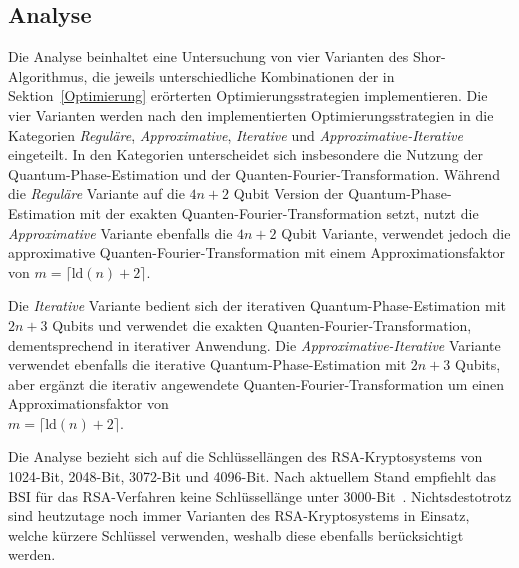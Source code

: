 \subsection*{Analyse}
Die Analyse beinhaltet eine Untersuchung von vier Varianten des Shor-Algorithmus, 
die jeweils unterschiedliche Kombinationen der in Sektion~\ref{Optimierung} erörterten Optimierungsstrategien implementieren.
Die vier Varianten werden nach den implementierten Optimierungsstrategien in die Kategorien \textit{Reguläre}, 
\textit{Approximative}, \textit{Iterative} und \textit{Approximative-Iterative} eingeteilt.
In den Kategorien unterscheidet sich insbesondere die Nutzung der Quantum-Phase-Estimation und der Quanten-Fourier-Transformation. 
Während die \textit{Reguläre} Variante auf die \(4n+2\) Qubit Version der Quantum-Phase-Estimation mit der exakten Quanten-Fourier-Transformation setzt, 
nutzt die \textit{Approximative} Variante ebenfalls die \(4n+2\) Qubit Variante, 
verwendet jedoch die approximative Quanten-Fourier-Transformation mit einem Approximationsfaktor von \(m = \lceil\text{ld}(n)+2\rceil\).

Die \textit{Iterative} Variante bedient sich der iterativen Quantum-Phase-Estimation mit \(2n+3\) Qubits und 
verwendet die exakten Quanten-Fourier-Transformation, dementsprechend in iterativer Anwendung.
Die \textit{Approximative-Iterative} Variante verwendet ebenfalls die iterative Quantum-Phase-Estimation mit \(2n+3\) Qubits, 
aber ergänzt die iterativ angewendete Quanten-Fourier-Transformation um einen Approximationsfaktor von \\\(m = \lceil\text{ld}(n)+2\rceil\).

Die Analyse bezieht sich auf die Schlüssellängen des RSA-Kryptosystems von 1024-Bit, 2048-Bit, 3072-Bit und 4096-Bit. 
Nach aktuellem Stand empfiehlt das BSI für das RSA-Verfahren keine Schlüssellänge unter 3000-Bit~\cite{BSI2023}. 
Nichtsdestotrotz sind heutzutage noch immer Varianten des RSA-Kryptosystems in Einsatz, welche kürzere Schlüssel verwenden, 
weshalb diese ebenfalls berücksichtigt werden.

\vspace{1em}

